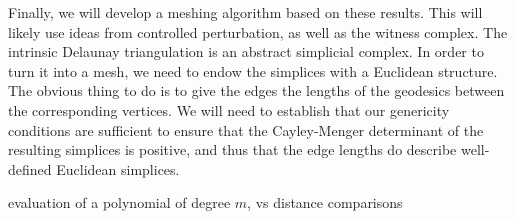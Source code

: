 Finally, we will develop a meshing algorithm based on these
results. This will likely use ideas from controlled perturbation, as
well as the witness complex. The intrinsic Delaunay triangulation is
an abstract simplicial complex. In order to turn it into a mesh, we
need to endow the simplices with a Euclidean structure. The obvious
thing to do is to give the edges the lengths of the geodesics between
the corresponding vertices. We will need to establish that our
genericity conditions are sufficient to ensure that the Cayley-Menger
determinant of the resulting simplices is positive, and thus that the
edge lengths do describe well-defined Euclidean simplices.


%

evaluation of a polynomial of degree $m$, vs distance comparisons





